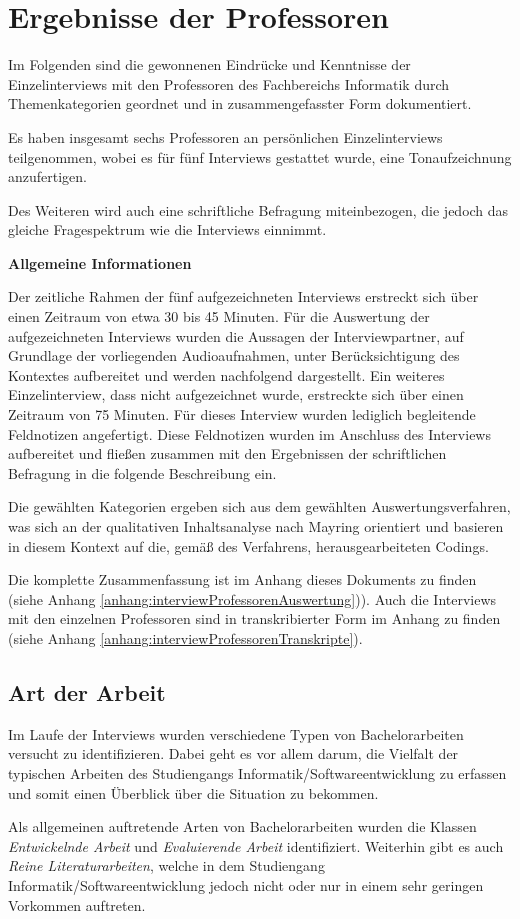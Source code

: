 \documentclass[bibliography=totoc,listof=totoc,BCOR=5mm,DIV=12,oneside]{scrbook}
\begin{document}
\section{Ergebnisse der Professoren}
\par Im Folgenden sind die gewonnenen Eindrücke und Kenntnisse der Einzelinterviews mit den Professoren des Fachbereichs Informatik durch Themenkategorien geordnet und in zusammengefasster Form dokumentiert.
\par Es haben insgesamt sechs Professoren an persönlichen Einzelinterviews teilgenommen, wobei es für fünf Interviews gestattet wurde, eine Tonaufzeichnung anzufertigen.
\par\medskip Des Weiteren wird auch eine schriftliche Befragung miteinbezogen, die jedoch das gleiche Fragespektrum wie die Interviews einnimmt.
\par\bigskip \textbf{Allgemeine Informationen}
\par Der zeitliche Rahmen der fünf aufgezeichneten Interviews erstreckt sich über einen Zeitraum von etwa 30 bis 45 Minuten. Für die Auswertung der aufgezeichneten Interviews wurden die Aussagen der Interviewpartner, auf Grundlage der vorliegenden Audioaufnahmen, unter Berücksichtigung des Kontextes aufbereitet und werden nachfolgend dargestellt. Ein weiteres Einzelinterview, dass nicht aufgezeichnet wurde, erstreckte sich über einen Zeitraum von 75 Minuten. Für dieses Interview wurden lediglich begleitende Feldnotizen angefertigt. Diese Feldnotizen wurden im Anschluss des Interviews aufbereitet und fließen zusammen mit den Ergebnissen der schriftlichen Befragung in die folgende Beschreibung ein.
\par\medskip Die gewählten Kategorien ergeben sich aus dem gewählten Auswertungsverfahren, was sich an der qualitativen Inhaltsanalyse nach Mayring\citep{Mayring2015} orientiert und basieren in diesem Kontext auf die, gemäß des Verfahrens, herausgearbeiteten Codings.

\par \bigskip Die komplette Zusammenfassung ist im Anhang dieses Dokuments zu finden (siehe Anhang \ref{anhang:interviewProfessorenAuswertung})). Auch die Interviews mit den einzelnen Professoren sind in transkribierter Form im Anhang zu finden (siehe Anhang \ref{anhang:interviewProfessorenTranskripte}).

\newpage
\subsection{Art der Arbeit}
\par Im Laufe der Interviews wurden verschiedene Typen von Bachelorarbeiten versucht zu identifizieren. Dabei geht es vor allem darum, die Vielfalt der typischen Arbeiten des Studiengangs Informatik/Softwareentwicklung zu erfassen und somit einen Überblick über die Situation zu bekommen.
\par \medskip Als allgemeinen auftretende Arten von Bachelorarbeiten wurden die Klassen \textit{Entwickelnde Arbeit}  und \textit{Evaluierende Arbeit} identifiziert. Weiterhin gibt es auch \textit{Reine Literaturarbeiten}, welche in dem Studiengang Informatik/Softwareentwicklung jedoch nicht oder nur in einem sehr geringen Vorkommen auftreten.
\end{document}
